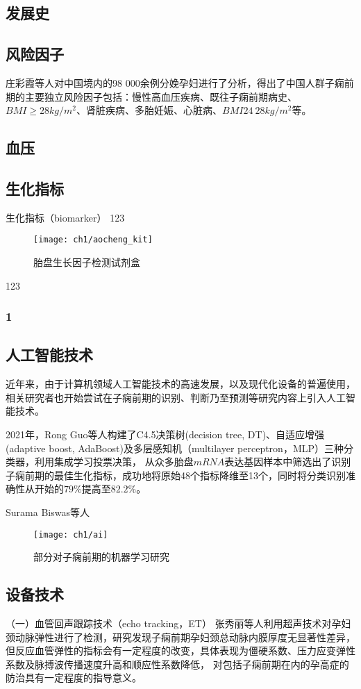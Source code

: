 \subsection{发展史}
\subsection{风险因子}
庄彩霞等人\cite{Zhuang2019}对中国境内的98 000余例分娩孕妇进行了分析，得出了中国人群子痫前期的主要独立风险因子包括：慢性高血压疾病、既往子痫前期病史、$BMI≥28kg/m^2$、肾脏疾病、多胎妊娠、心脏病、$BMI 24~28kg/m^2$等。
\subsection{血压}
\subsection{生化指标}
生化指标（biomarker）
123

\begin{figure}[htbp]
    \centering
    \texttt{[image: ch1/aocheng\_kit]}
    \caption{\label{fig:aocheng_kit}胎盘生长因子检测试剂盒}
\end{figure}
123

\subsubsection{1}

\subsection{人工智能技术}
近年来，由于计算机领域人工智能技术的高速发展，以及现代化设备的普遍使用，
相关研究者也开始尝试在子痫前期的识别、判断乃至预测等研究内容上引入人工智能技术。

2021年，Rong Guo等人\cite{Guo2021}构建了C4.5决策树(decision tree, DT)、自适应增强(adaptive boost, AdaBoost)及多层感知机（multilayer perceptron，MLP）三种分类器，利用集成学习投票决策，
从众多胎盘$mRNA$表达基因样本中筛选出了识别子痫前期的最佳生化指标，成功地将原始48个指标降维至13个，同时将分类识别准确性从开始的$79\%$提高至$82.2\%$。

Surama Biswas等人
\begin{figure}[htbp]
    \centering
    \texttt{[image: ch1/ai]}
    \caption{\label{fig:ai}部分对子痫前期的机器学习研究}
\end{figure}


\subsection{设备技术}
（一）血管回声跟踪技术（echo tracking，ET）
张秀丽等人\cite{Zhang2014}利用超声技术对孕妇颈动脉弹性进行了检测，研究发现子痫前期孕妇颈总动脉内膜厚度无显著性差异，但反应血管弹性的指标会有一定程度的改变，具体表现为僵硬系数、压力应变弹性系数及脉搏波传播速度升高和顺应性系数降低，
对包括子痫前期在内的孕高症的防治具有一定程度的指导意义。


